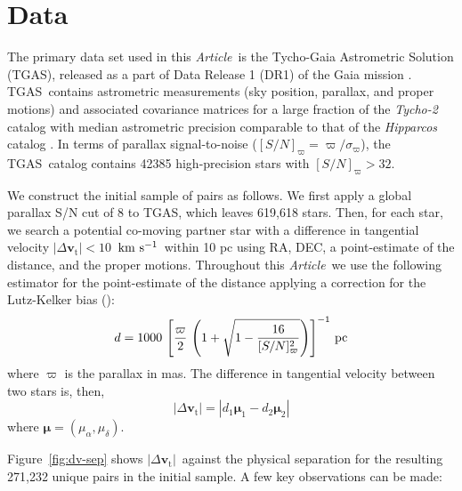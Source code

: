 \documentclass[manuscript, letterpaper]{aastex6}
\newcommand{\project}[1]{\textsl{#1}}
\newcommand{\acronym}[1]{{\small{#1}}}
\newcommand{\documentname}{\textsl{Article}}
\newcommand{\dr}{\acronym{DR1}}
\newcommand{\tgas}{\acronym{TGAS}}
\newcommand{\bs}[1]{\boldsymbol{#1}}
\renewcommand{\vec}[1]{\bs{#1}}
\newcommand{\kms}{\ensuremath{\rm km~s^{-1}}}
\newcommand{\snr}{[S/N]_\varpi}
\newcommand{\absdvtan}{\ensuremath{|\Delta\vec v_\mathrm{t}|}}
\begin{document}


\section{Data} \label{sec:data}

The primary data set used in this \documentname\ is the Tycho-Gaia Astrometric
Solution (\tgas), released as a part of Data Release 1 (\dr) of the Gaia mission
\citep{Gaia-Collaboration:2016aa,Lindegren:2016aa}.
\tgas\ contains astrometric measurements (sky position,
parallax, and proper motions) and associated covariance matrices for a large
fraction of the \project{Tycho-2} catalog \citep{2000A&A...355L..27H} with median
astrometric precision comparable to that of the \project{Hipparcos} catalog
\citep[$\approx 0.3~{\rm mas}$;][]{2007ASSL..350.....V}. In terms of parallax
signal-to-noise ($\snr = \varpi/\sigma_\varpi$), the \tgas\ catalog contains
42385 high-precision stars with $\snr > 32$.

We construct the initial sample of pairs as follows.
We first apply a global parallax S/N cut of 8 to \tgas, which leaves 619,618 stars.
Then, for each star, we search a potential co-moving partner star with a
difference in tangential velocity $\absdvtan < 10$~\kms\ within 10 pc
using RA, DEC, a point-estimate of the distance, and the proper motions.
Throughout this \documentname\, we use the following estimator for
the point-estimate of the distance applying a correction for the Lutz-Kelker bias
(\citealt{Lutz:1973aa}):
\begin{equation}
  d = 1000 \, \left[\frac{\varpi}{2} \,
    \left(1 + \sqrt{1 - \frac{16}{\snr^2}} \right) \right]^{-1} \, {\rm pc}
\end{equation}
where $\varpi$ is the parallax in mas.
The difference in tangential velocity between two stars is, then,
\begin{equation}
  \absdvtan = |d_1 \vec\mu_1 - d_2 \vec\mu_2|
\end{equation}
where $\vec\mu = (\mu_\alpha, \mu_\delta)$.

Figure~\ref{fig:dv-sep} shows \absdvtan\ against the physical separation
for the resulting 271,232 unique pairs in the initial sample.
A few key observations can be made:
\end{document}
